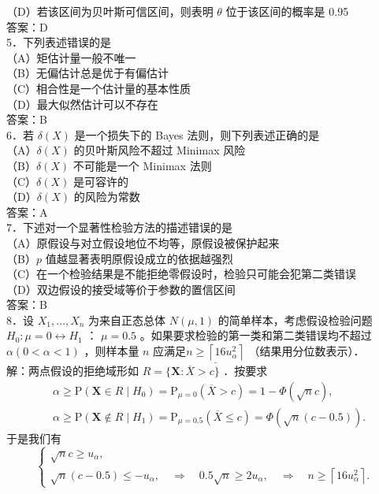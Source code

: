 \documentclass[UTF8]{ctexart}
\begin{document}
（D）若该区间为贝叶斯可信区间，则表明 $\theta$ 位于该区间的概率是 0.95\\
答案：D\\
5．下列表述错误的是\underline{\hspace{2cm}}\\
（A）矩估计量一般不唯一\\
（B）无偏估计总是优于有偏估计\\
（C）相合性是一个估计量的基本性质\\
（D）最大似然估计可以不存在\\
答案：B\\
6．若 $\delta(X)$ 是一个损失下的 Bayes 法则，则下列表述正确的是\underline{\hspace{2cm}}\\
（A）$\delta(X)$ 的贝叶斯风险不超过 Minimax 风险\\
（B）$\delta(X)$ 不可能是一个 Minimax 法则\\
（C）$\delta(X)$ 是可容许的\\
（D）$\delta(X)$ 的风险为常数\\
答案：A\\
7．下述对一个显著性检验方法的描述错误的是\underline{\hspace{2cm}}\\
（A）原假设与对立假设地位不均等，原假设被保护起来\\
（B）$p$ 值越显著表明原假设成立的依据越强烈\\
（C）在一个检验结果是不能拒绝零假设时，检验只可能会犯第二类错误\\
（D）双边假设的接受域等价于参数的置信区间\\
答案：B\\
8．设 $X_1, \ldots, X_n$ 为来自正态总体 $N(\mu, 1)$ 的简单样本，考虑假设检验问题 $H_0: \mu=0 \leftrightarrow H_1$ ： $\mu=0.5$ 。如果要求检验的第一类和第二类错误均不超过 $\alpha(0<\alpha<1)$ ，则样本量 $n$ 应满足$\underline{n \geq\left\lceil 16 u_\alpha^2\right\rceil}$ （结果用分位数表示）．\\
解：两点假设的拒绝域形如 $R=\{\boldsymbol{X}: \overline{X}>c\}$ ．按要求
$$
\begin{aligned}
	& \alpha \geq \mathrm{P}\left(\boldsymbol{X} \in R \mid H_0\right)=\mathrm{P}_{\mu=0}(\overline{X}>c)=1-\Phi(\sqrt{n} c), \\
	& \alpha \geq \mathrm{P}\left(\boldsymbol{X} \notin R \mid H_1\right)=\mathrm{P}_{\mu=0.5}(\overline{X} \leq c)=\Phi(\sqrt{n}(c-0.5)) .
\end{aligned}
$$
于是我们有
$$
\left\{\begin{array}{l}
	\sqrt{n} c \geq u_\alpha, \\
	\sqrt{n}(c-0.5) \leq-u_\alpha, \quad \Longrightarrow \quad 0.5 \sqrt{n} \geq 2 u_\alpha, \quad \Longrightarrow \quad n \geq\left\lceil 16 u_\alpha^2\right\rceil .
\end{array}\right.
$$
\end{document}
